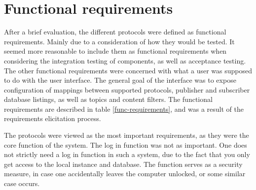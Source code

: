\section{Functional requirements}

After a brief evaluation, the different protocols were defined as functional requirements. Mainly due to a consideration of how they would be tested. It seemed more reasonable to include them as functional requirements when considering the integration testing of components, as well as acceptance testing. The other functional requirements were concerned with what a user was supposed to do with the user interface. The general goal of the interface was to expose configuration of mappings between supported protocols, publisher and subscriber database listings, as well as topics and content filters. The functional requirements are described in table \ref{func-requirements}, and was a result of the requirements elicitation process.

The protocols were viewed as the most important requirements, as they were the core function of the system. The log in function was not as important. One does not strictly need a log in function in such a system, due to the fact that you only get access to the local instance and database. The function serves as a security measure, in case one accidentally leaves the computer unlocked, or some similar case occurs.

